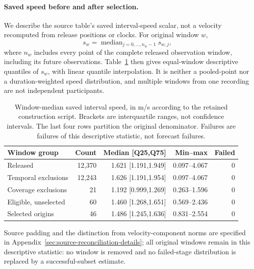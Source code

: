 \documentclass[11pt]{article}
\begin{document}
\paragraph{Saved speed before and after selection.}\label{sec:final-cohort-speeds}
We describe the source table's saved interval-speed scalar, not a velocity
recomputed from release positions or clocks. For original window \(w\),
\begin{equation}
 s_w=\operatorname{median}_{j=0,\ldots,n_w-1}s_{w,j},
 \label{eq:cohort-window-speed}
\end{equation}
where \(n_w\) includes every point of the complete released observation
window, including its future observations. Table~\ref{tab:final-cohort-speeds}
then gives equal-window descriptive quantiles of \(s_w\), with linear
quantile interpolation. It is neither a pooled-point nor a duration-weighted
speed distribution, and multiple windows from one recording are not
independent participants.

\begin{table}[htbp]
\centering\small
\caption{Window-median saved interval speed, in m/s according to the retained construction script. Brackets are interquartile ranges, not confidence intervals. The last four rows partition the original denominator. Failures are failures of this descriptive statistic, not forecast failures.}
\label{tab:final-cohort-speeds}
\begin{tabular}{@{}lrrrr@{}}
\toprule
Window group & Count & Median [Q25,Q75] & Min--max & Failed\\
\midrule
Released & 12,370 & 1.621 [1.191,1.949] & 0.097--4.067 & 0\\
Temporal exclusions & 12,243 & 1.626 [1.191,1.954] & 0.097--4.067 & 0\\
Coverage exclusions & 21 & 1.192 [0.999,1.269] & 0.263--1.596 & 0\\
Eligible, unselected & 60 & 1.460 [1.268,1.651] & 0.569--2.436 & 0\\
Selected origins & 46 & 1.486 [1.245,1.636] & 0.831--2.554 & 0\\
\bottomrule
\end{tabular}
\end{table}

Source padding and the distinction from velocity-component norms are
specified in Appendix~\ref{sec:source-reconciliation-details}; all original
windows remain in this descriptive statistic: no window is removed and no
failed-stage distribution is replaced by a successful-subset estimate.
\end{document}
